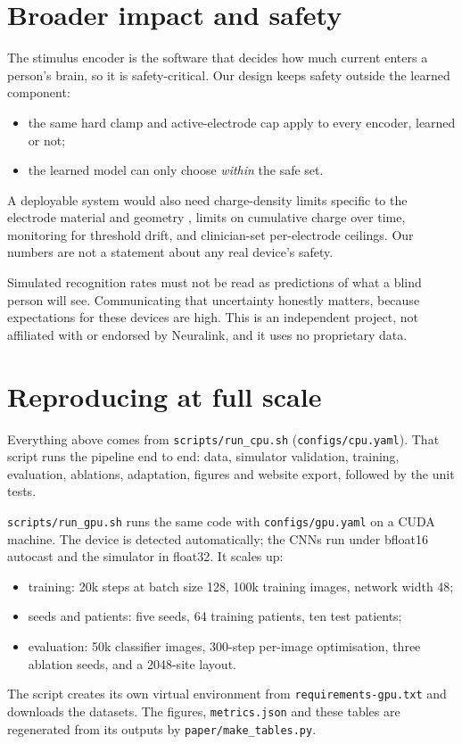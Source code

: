 \section{Broader impact and safety}
The stimulus encoder is the software that decides how much current enters a person's brain, so it is safety-critical. Our design keeps safety outside the learned component:
\begin{itemize}
\item the same hard clamp and active-electrode cap apply to every encoder, learned or not;
\item the learned model can only choose \emph{within} the safe set.
\end{itemize}
A deployable system would also need charge-density limits specific to the electrode material and geometry \citep{shannon1992model,cogan2008neural}, limits on cumulative charge over time, monitoring for threshold drift, and clinician-set per-electrode ceilings. Our numbers are not a statement about any real device's safety.

Simulated recognition rates must not be read as predictions of what a blind person will see. Communicating that uncertainty honestly matters, because expectations for these devices are high. This is an independent project, not affiliated with or endorsed by Neuralink, and it uses no proprietary data.

\section{Reproducing at full scale}\label{sec:repro}
Everything above comes from \texttt{scripts/run\_cpu.sh} (\texttt{configs/cpu.yaml}). That script runs the pipeline end to end: data, simulator validation, training, evaluation, ablations, adaptation, figures and website export, followed by the unit tests.

\texttt{scripts/run\_gpu.sh} runs the same code with \texttt{configs/gpu.yaml} on a CUDA machine. The device is detected automatically; the CNNs run under bfloat16 autocast and the simulator in float32. It scales up:
\begin{itemize}
\item training: 20k steps at batch size 128, 100k training images, network width 48;
\item seeds and patients: five seeds, 64 training patients, ten test patients;
\item evaluation: 50k classifier images, 300-step per-image optimisation, three ablation seeds, and a 2048-site layout.
\end{itemize}
The script creates its own virtual environment from \texttt{requirements-gpu.txt} and downloads the datasets. The figures, \texttt{metrics.json} and these tables are regenerated from its outputs by \texttt{paper/make\_tables.py}.
